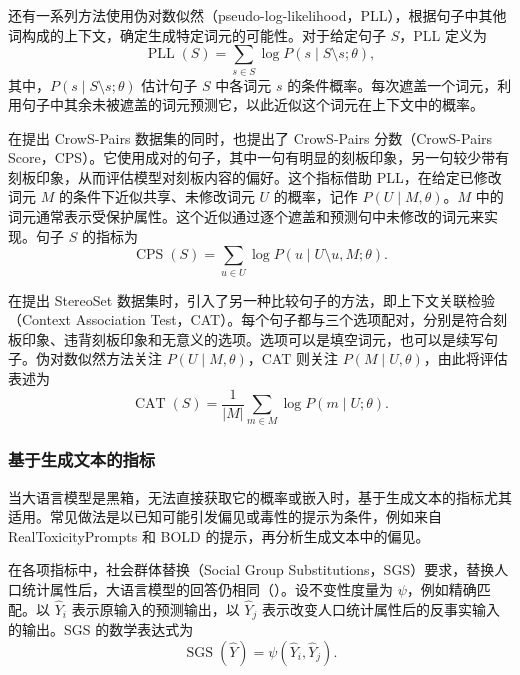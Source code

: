 还有一系列方法使用伪对数似然（pseudo-log-likelihood，PLL），根据句子中其他词构成的上下文，确定生成特定词元的可能性。对于给定句子 $S$，PLL 定义为
\begin{equation}
\operatorname{PLL}(S)=\sum_{s\in S}\log P(s\mid S\setminus s;\theta),
\label{eq:ch06-pll}
\end{equation}
其中，$P(s\mid S\setminus s;\theta)$ 估计句子 $S$ 中各词元 $s$ 的条件概率。每次遮盖一个词元，利用句子中其余未被遮盖的词元预测它，以此近似这个词元在上下文中的概率。

在提出 CrowS-Pairs 数据集的同时，也提出了 CrowS-Pairs 分数（CrowS-Pairs Score，CPS）。它使用成对的句子，其中一句有明显的刻板印象，另一句较少带有刻板印象，从而评估模型对刻板内容的偏好。这个指标借助 PLL，在给定已修改词元 $M$ 的条件下近似共享、未修改词元 $U$ 的概率，记作 $P(U\mid M,\theta)$。$M$ 中的词元通常表示受保护属性。这个近似通过逐个遮盖和预测句中未修改的词元来实现。句子 $S$ 的指标为
\begin{equation}
\operatorname{CPS}(S)=\sum_{u\in U}\log P(u\mid U\setminus u,M;\theta).
\label{eq:ch06-cps}
\end{equation}

在提出 StereoSet 数据集时，引入了另一种比较句子的方法，即上下文关联检验（Context Association Test，CAT）。每个句子都与三个选项配对，分别是符合刻板印象、违背刻板印象和无意义的选项。选项可以是填空词元，也可以是续写句子。伪对数似然方法关注 $P(U\mid M,\theta)$，CAT 则关注 $P(M\mid U,\theta)$，由此将评估表述为
\begin{equation}
\operatorname{CAT}(S)=\frac{1}{|M|}\sum_{m\in M}\log P(m\mid U;\theta).
\label{eq:ch06-cat}
\end{equation}

\subsubsection{基于生成文本的指标}
当大语言模型是黑箱，无法直接获取它的概率或嵌入时，基于生成文本的指标尤其适用。常见做法是以已知可能引发偏见或毒性的提示为条件，例如来自 RealToxicityPrompts 和 BOLD 的提示，再分析生成文本中的偏见。

在各项指标中，社会群体替换（Social Group Substitutions，SGS）要求，替换人口统计属性后，大语言模型的回答仍相同（）。设不变性度量为 $\psi$，例如精确匹配。以 $\widehat{Y}_i$ 表示原输入的预测输出，以 $\widehat{Y}_j$ 表示改变人口统计属性后的反事实输入的输出。SGS 的数学表达式为
\begin{equation}
\operatorname{SGS}(\widehat{Y})=\psi(\widehat{Y}_i,\widehat{Y}_j).
\label{eq:ch06-sgs}
\end{equation}

